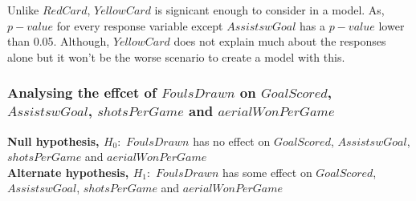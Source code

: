 \documentclass[12pt]{article}
\begin{document}
Unlike $ RedCard $, $ YellowCard $ is signicant enough to consider in a model. As, $ p-value $ for every response variable except $ AssistswGoal $ has a $ p-value $ lower than 0.05. Although, $ YellowCard $ does not explain much about the responses alone but it won't be the worse scenario to create a model with this. 

\newpage

\subsubsection{Analysing the effcet of $ FoulsDrawn $ on $ GoalScored $, \\ $ AssistswGoal $, $ shotsPerGame $ and $ aerialWonPerGame $}

\textbf{Null hypothesis, $ H_0: $} $ FoulsDrawn $ has no effect on $ GoalScored $, $ AssistswGoal $, $ shotsPerGame $ and $ aerialWonPerGame $\\
\textbf{Alternate hypothesis, $ H_1: $} $ FoulsDrawn $ has some effect on $ GoalScored $, $ AssistswGoal $, $ shotsPerGame $ and $ aerialWonPerGame $
\end{document}
